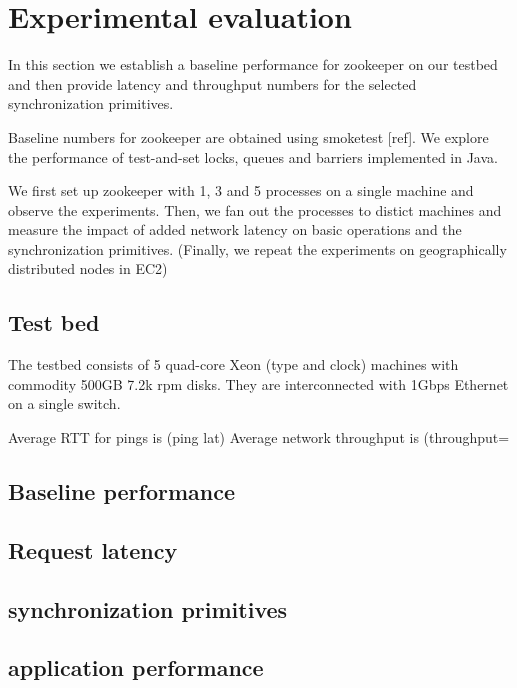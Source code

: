 \section{Experimental evaluation}\label{sec:eval}
In this section we establish a baseline performance for zookeeper on our
testbed and then provide latency and throughput numbers for the selected
synchronization primitives.

Baseline numbers for zookeeper are obtained using smoketest [ref]. We explore
the performance of test-and-set locks, queues and barriers implemented in Java.

We first set up zookeeper with 1, 3 and 5 processes on a single machine and
observe the experiments. Then, we fan out the processes to distict machines and
measure the impact of added network latency on basic operations and the
synchronization primitives. (Finally, we repeat the experiments on
geographically distributed nodes in EC2)

\subsection{Test bed}
The testbed consists of 5 quad-core Xeon (type and clock) machines with commodity 500GB 7.2k rpm disks. They are interconnected with 1Gbps Ethernet on a single switch.

Average RTT for pings is (ping lat)
Average network throughput is (throughput=

\subsection{Baseline performance}

\subsection{Request latency}

\subsection{synchronization primitives}

\subsection{application performance}


